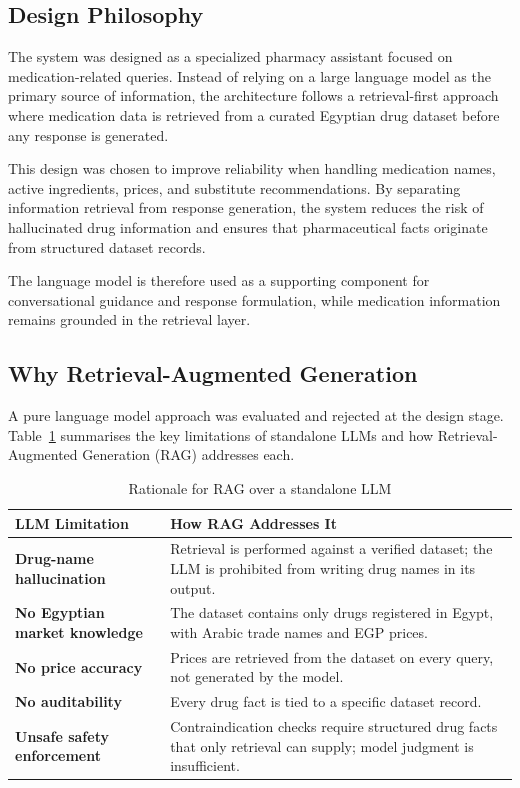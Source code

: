 \documentclass[12pt,a4paper]{article}
\begin{document}
\subsection{Design Philosophy}

The system was designed as a specialized pharmacy assistant focused on
medication-related queries. Instead of relying on a large language model as
the primary source of information, the architecture follows a retrieval-first
approach where medication data is retrieved from a curated Egyptian drug
dataset before any response is generated.

This design was chosen to improve reliability when handling medication names,
active ingredients, prices, and substitute recommendations. By separating
information retrieval from response generation, the system reduces the risk
of hallucinated drug information and ensures that pharmaceutical facts
originate from structured dataset records.

The language model is therefore used as a supporting component for
conversational guidance and response formulation, while medication information
remains grounded in the retrieval layer.

\subsection{Why Retrieval-Augmented Generation}

A pure language model approach was evaluated and rejected at the design stage.
Table~\ref{tab:rag-rationale} summarises the key limitations of standalone
LLMs and how Retrieval-Augmented Generation (RAG) addresses each.

\begin{table}[H]
\centering
\caption{Rationale for RAG over a standalone LLM}
\label{tab:rag-rationale}
\renewcommand{\arraystretch}{1.3}
\begin{tabularx}{\textwidth}{>{\bfseries}p{3.8cm} X}
\toprule
LLM Limitation & How RAG Addresses It \\
\midrule
Drug-name hallucination &
    Retrieval is performed against a verified dataset; the LLM is
    prohibited from writing drug names in its output. \\
No Egyptian market knowledge &
    The dataset contains only drugs registered in Egypt, with Arabic
    trade names and EGP prices. \\
No price accuracy &
    Prices are retrieved from the dataset on every query, not generated
    by the model. \\
No auditability &
    Every drug fact is tied to a specific dataset record. \\
Unsafe safety enforcement &
    Contraindication checks require structured drug facts that only
    retrieval can supply; model judgment is insufficient. \\
\bottomrule
\end{tabularx}
\end{table}
\end{document}
